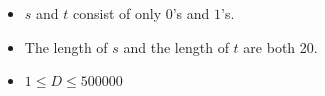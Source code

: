 \begin{itemize}
\tightlist
\item $s$ and $t$ consist of only $0$'s and $1$'s.
\item The length of $s$ and the length of $t$ are both 20.
\item $1\le D\le 500000$
\end{itemize}
\newpage
